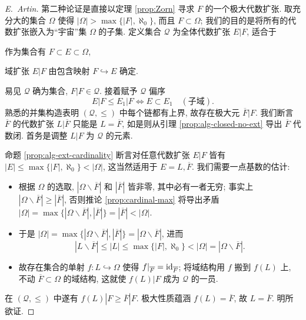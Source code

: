 \begin{proof}[E.\ Artin]
	第二种论证是直接以定理 \ref{prop:Zorn} 寻求 $F$ 的一个极大代数扩张. 取充分大的集合 $\Omega$ 使得 $|\Omega| > \max\{|F|, \aleph_0\}$, 而且 $F \subset \Omega$; 我们的目的是将所有的代数扩张嵌入为``宇宙''集 $\Omega$ 的子集. 定义集合 $\mathcal{Q}$ 为全体代数扩张 $E|F$, 适合于
	\begin{inparaenum}[(i)]
		\item 作为集合有 $F \subset E \subset \Omega$,
		\item 域扩张 $E|F$ 由包含映射 $F \hookrightarrow E$ 确定.
	\end{inparaenum}
	易见 $\mathcal{Q}$ 确为集合, $F|F \in \mathcal{Q}$. 接着赋予 $\mathcal{Q}$ 偏序
	\[ E|F \leq E_1|F \iff E \subset E_1 \quad (\text{子域}). \]
	熟悉的并集构造表明 $(\mathcal{Q}, \leq)$ 中每个链都有上界, 故存在极大元 $\overline{F}|F$. 我们断言 $\overline{F}$ 的代数扩张 $L|\overline{F}$ 只能是 $L=\overline{F}$, 如是则从引理 \ref{prop:alg-closed-no-ext} 导出 $\overline{F}$ 代数闭. 首务是调整 $L|F$ 为 $\mathcal{Q}$ 的元素.
	
	命题 \ref{prop:alg-ext-cardinality} 断言对任意代数扩张 $E|F$ 皆有 $|E| \leq \max\{|F|, \aleph_0\} < |\Omega|$, 这当然适用于 $E = L, \overline{F}$. 我们需要一点基数的估计:
	\begin{itemize}
		\item 根据 $\Omega$ 的选取, $|\Omega \smallsetminus \overline{F}|$ 和 $|\overline{F}|$ 皆非零, 其中必有一者无穷; 事实上 $|\Omega \smallsetminus \overline{F}| \geq |\overline{F}|$, 否则推论 \ref{prop:cardinal-max} 将导出矛盾 $|\Omega| = \max\{|\Omega \smallsetminus \overline{F}|, |\overline{F}|\} = |\overline{F}| < |\Omega|$.
		\item 于是 $|\Omega| = \max\{|\Omega \smallsetminus \overline{F}|, |\overline{F}|\} = |\Omega \smallsetminus \overline{F}|$, 进而
			\[ |L \smallsetminus \overline{F}| \leq |L| \leq \max\{|F|, \aleph_0\} < |\Omega| = |\Omega \smallsetminus \overline{F}|. \] 
		\item 故存在集合的单射 $f: L \hookrightarrow \Omega$ 使得 $f|_{\overline{F}} = \mathrm{id}_{\overline{F}}$; 将域结构用 $f$ 搬到 $f(L)$ 上, 不动 $\overline{F} \subset \Omega$ 的域结构, 这就使 $f(L)|F$ 成为 $\mathcal{Q}$ 的一员.
	\end{itemize}
	在 $(\mathcal{Q}, \leq)$ 中遂有 $f(L)|F \geq \overline{F}|F$. 极大性质蕴涵 $f(L)=\overline{F}$, 故 $L=\overline{F}$. 明所欲证.
\end{proof}

